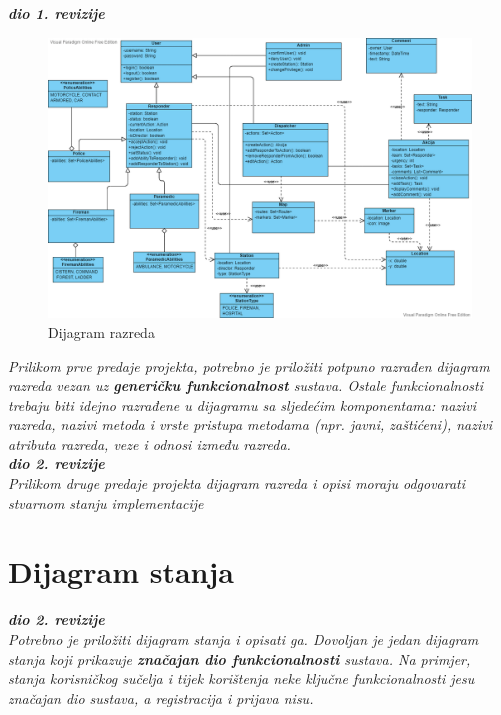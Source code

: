 			\textbf{\textit{dio 1. revizije}}\\
			\begin{figure}[H]
				\includegraphics[scale=0.4]{slike/classes.PNG}
				\centering
				\caption{Dijagram razreda}
				\label{fig:razredi}
			\end{figure}
		
			\textit{Prilikom prve predaje projekta, potrebno je priložiti potpuno razrađen dijagram razreda vezan uz \textbf{generičku funkcionalnost} sustava. Ostale funkcionalnosti trebaju biti idejno razrađene u dijagramu sa sljedećim komponentama: nazivi razreda, nazivi metoda i vrste pristupa metodama (npr. javni, zaštićeni), nazivi atributa razreda, veze i odnosi između razreda.}\\
			
			\textbf{\textit{dio 2. revizije}}\\			
			
			\textit{Prilikom druge predaje projekta dijagram razreda i opisi moraju odgovarati stvarnom stanju implementacije}
			
			
			
			\eject
		
		\section{Dijagram stanja}
			
			
			\textbf{\textit{dio 2. revizije}}\\
			
			\textit{Potrebno je priložiti dijagram stanja i opisati ga. Dovoljan je jedan dijagram stanja koji prikazuje \textbf{značajan dio funkcionalnosti} sustava. Na primjer, stanja korisničkog sučelja i tijek korištenja neke ključne funkcionalnosti jesu značajan dio sustava, a registracija i prijava nisu. }
			
